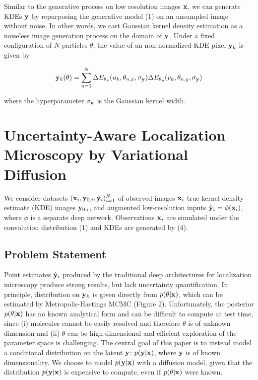 \documentclass{article}
\begin{document}
Similar to the generative process on low resolution images $\bold{x}$, we can generate KDEs $\bold{y}$ by repurposing the generative model (1) on an unsampled image without noise. In other words, we cast Gaussian kernel density estimation as a noiseless image generation process on the domain of $\bold{y}$. Under a fixed configuration of $N$ particles $\theta$, the value of an non-normalized KDE pixel $\bold{y}_{k}$ is given by

\begin{equation}
\bold{y}_{k}(\theta) = \sum_{n=1}^{N}\Delta E_{\theta_x}(u_{k},\theta_{n,x},\sigma_{\bold{y}}) \Delta E_{\theta_y}(v_{k},\theta_{n,y},\sigma_{\bold{y}})
\end{equation}

where the hyperparameter $\sigma_{\bold{y}}$ is the Gaussian kernel width. 

\section{Uncertainty-Aware Localization Microscopy by Variational Diffusion}

We consider datasets $(\bold{x}_i,\bold{y}_{0,i},\hat{\bold{y}}_{i})_{i=1}^{N}$ of observed images $\bold{x}_i$ true kernel density estimate (KDE) images $\bold{y}_{0,i}$, and augmented low-resolution inputs $\hat{\bold{y}}_{i}=\phi(\bold{x}_{i})$, where $\phi$ is a separate deep network. Observations $\bold{x}_i$ are simulated under the convolution distribution (1) and KDEs are generated by (4).

\subsection{Problem Statement}

Point estimates $\hat{\bold{y}}_{i}$ produced by the traditional deep architectures for localization microscopy produce strong results, but lack uncertainty quantification. In principle, distribution on $\bold{y}_{k}$ is given directly from $p(\theta|\bold{x})$, which can be estimated by Metropolis-Hastings MCMC (Figure 2). Unfortunately, the posterior $p(\theta|\bold{x})$ has no known analytical form and can be difficult to compute at test time, since (i) molecules cannot be easily resolved and therefore $\theta$ is of unknown dimension and (ii) $\theta$ can be high dimensional and efficient exploration of the parameter space is challenging. The central goal of this paper is to instead model a conditional distribution on the latent $\bold{y}$: $p(\bold{y}|\bold{x})$, where $\bold{y}$ is of known dimensionality. We choose to model $p(\bold{y}|\bold{x})$ with a diffusion model, given that the distribution $p(\bold{y}|\bold{x})$ is expensive to compute, even if $p(\theta|\bold{x})$ were known.
\end{document}
